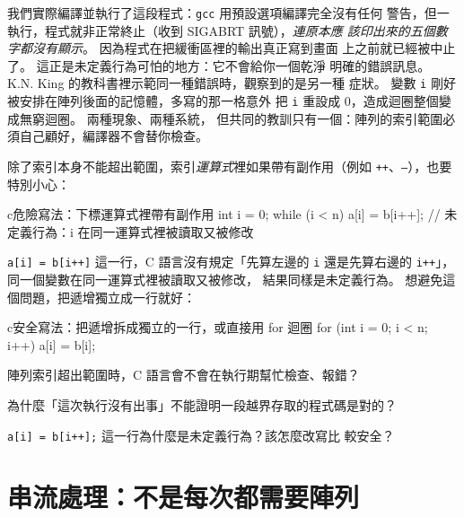 我們實際編譯並執行了這段程式：\texttt{gcc} 用預設選項編譯完全沒有任何
警告，但一執行，程式就非正常終止（收到 SIGABRT 訊號），\emph{連原本應
該印出來的五個數字都沒有顯示}。 因為程式在把緩衝區裡的輸出真正寫到畫面
上之前就已經被中止了。 這正是未定義行為可怕的地方：它不會給你一個乾淨
明確的錯誤訊息。 K.N. King 的教科書裡示範同一種錯誤時，觀察到的是另一種
症狀。 變數 \texttt{i} 剛好被安排在陣列後面的記憶體，多寫的那一格意外
把 \texttt{i} 重設成 $0$，造成迴圈整個變成無窮迴圈。 兩種現象、兩種系統，
但共同的教訓只有一個：陣列的索引範圍必須自己顧好，編譯器不會替你檢查。


除了索引本身不能超出範圍，索引\emph{運算式}裡如果帶有副作用（例如
\texttt{++}、\texttt{--}），也要特別小心：

\begin{code}{c}{危險寫法：下標運算式裡帶有副作用}
int i = 0;
while (i < n) {
    a[i] = b[i++];   // 未定義行為：i 在同一運算式裡被讀取又被修改
}
\end{code}

\texttt{a[i] = b[i++]} 這一行，C 語言沒有規定「先算左邊的 \texttt{i}
還是先算右邊的 \texttt{i++}」，同一個變數在同一運算式裡被讀取又被修改，
結果同樣是未定義行為。 想避免這個問題，把遞增獨立成一行就好：

\begin{code}{c}{安全寫法：把遞增拆成獨立的一行，或直接用 for 迴圈}
for (int i = 0; i < n; i++) {
    a[i] = b[i];
}
\end{code}


\begin{drills}[label=drills:array-out-of-bounds]
\item 陣列索引超出範圍時，C 語言會不會在執行期幫忙檢查、報錯？
\item 為什麼「這次執行沒有出事」不能證明一段越界存取的程式碼是對的？
\item \texttt{a[i] = b[i++];} 這一行為什麼是未定義行為？該怎麼改寫比
較安全？
\end{drills}

\section{串流處理：不是每次都需要陣列}
\label{sec:array-stream-no-array}

